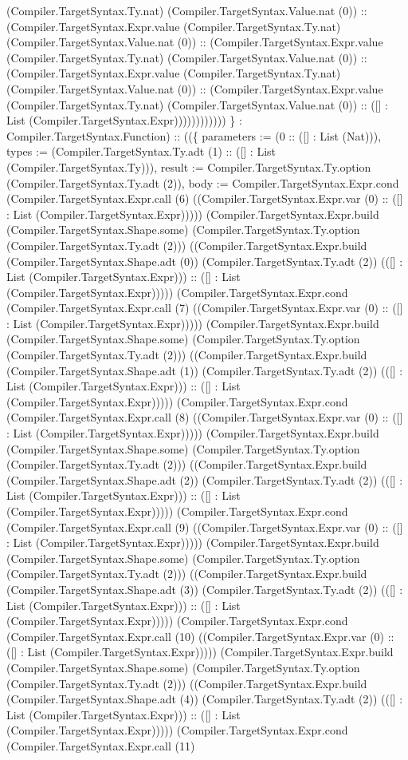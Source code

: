 \documentclass[11pt]{article}
\begin{document}
(Compiler.TargetSyntax.Ty.nat) (Compiler.TargetSyntax.Value.nat (0)) :: (Compiler.TargetSyntax.Expr.value (Compiler.TargetSyntax.Ty.nat) (Compiler.TargetSyntax.Value.nat (0)) :: (Compiler.TargetSyntax.Expr.value (Compiler.TargetSyntax.Ty.nat) (Compiler.TargetSyntax.Value.nat (0)) :: (Compiler.TargetSyntax.Expr.value (Compiler.TargetSyntax.Ty.nat) (Compiler.TargetSyntax.Value.nat (0)) :: (Compiler.TargetSyntax.Expr.value (Compiler.TargetSyntax.Ty.nat) (Compiler.TargetSyntax.Value.nat (0)) :: ([] : List (Compiler.TargetSyntax.Expr)))))))))))) \} : Compiler.TargetSyntax.Function) :: ((\{ parameters := (0 :: ([] : List (Nat))), types := (Compiler.TargetSyntax.Ty.adt (1) :: ([] : List (Compiler.TargetSyntax.Ty))), result := Compiler.TargetSyntax.Ty.option (Compiler.TargetSyntax.Ty.adt (2)), body := Compiler.TargetSyntax.Expr.cond (Compiler.TargetSyntax.Expr.call (6) ((Compiler.TargetSyntax.Expr.var (0) :: ([] : List (Compiler.TargetSyntax.Expr))))) (Compiler.TargetSyntax.Expr.build (Compiler.TargetSyntax.Shape.some) (Compiler.TargetSyntax.Ty.option (Compiler.TargetSyntax.Ty.adt (2))) ((Compiler.TargetSyntax.Expr.build (Compiler.TargetSyntax.Shape.adt (0)) (Compiler.TargetSyntax.Ty.adt (2)) (([] : List (Compiler.TargetSyntax.Expr))) :: ([] : List (Compiler.TargetSyntax.Expr))))) (Compiler.TargetSyntax.Expr.cond (Compiler.TargetSyntax.Expr.call (7) ((Compiler.TargetSyntax.Expr.var (0) :: ([] : List (Compiler.TargetSyntax.Expr))))) (Compiler.TargetSyntax.Expr.build (Compiler.TargetSyntax.Shape.some) (Compiler.TargetSyntax.Ty.option (Compiler.TargetSyntax.Ty.adt (2))) ((Compiler.TargetSyntax.Expr.build (Compiler.TargetSyntax.Shape.adt (1)) (Compiler.TargetSyntax.Ty.adt (2)) (([] : List (Compiler.TargetSyntax.Expr))) :: ([] : List (Compiler.TargetSyntax.Expr))))) (Compiler.TargetSyntax.Expr.cond (Compiler.TargetSyntax.Expr.call (8) ((Compiler.TargetSyntax.Expr.var (0) :: ([] : List (Compiler.TargetSyntax.Expr))))) (Compiler.TargetSyntax.Expr.build (Compiler.TargetSyntax.Shape.some) (Compiler.TargetSyntax.Ty.option (Compiler.TargetSyntax.Ty.adt (2))) ((Compiler.TargetSyntax.Expr.build (Compiler.TargetSyntax.Shape.adt (2)) (Compiler.TargetSyntax.Ty.adt (2)) (([] : List (Compiler.TargetSyntax.Expr))) :: ([] : List (Compiler.TargetSyntax.Expr))))) (Compiler.TargetSyntax.Expr.cond (Compiler.TargetSyntax.Expr.call (9) ((Compiler.TargetSyntax.Expr.var (0) :: ([] : List (Compiler.TargetSyntax.Expr))))) (Compiler.TargetSyntax.Expr.build (Compiler.TargetSyntax.Shape.some) (Compiler.TargetSyntax.Ty.option (Compiler.TargetSyntax.Ty.adt (2))) ((Compiler.TargetSyntax.Expr.build (Compiler.TargetSyntax.Shape.adt (3)) (Compiler.TargetSyntax.Ty.adt (2)) (([] : List (Compiler.TargetSyntax.Expr))) :: ([] : List (Compiler.TargetSyntax.Expr))))) (Compiler.TargetSyntax.Expr.cond (Compiler.TargetSyntax.Expr.call (10) ((Compiler.TargetSyntax.Expr.var (0) :: ([] : List (Compiler.TargetSyntax.Expr))))) (Compiler.TargetSyntax.Expr.build (Compiler.TargetSyntax.Shape.some) (Compiler.TargetSyntax.Ty.option (Compiler.TargetSyntax.Ty.adt (2))) ((Compiler.TargetSyntax.Expr.build (Compiler.TargetSyntax.Shape.adt (4)) (Compiler.TargetSyntax.Ty.adt (2)) (([] : List (Compiler.TargetSyntax.Expr))) :: ([] : List (Compiler.TargetSyntax.Expr))))) (Compiler.TargetSyntax.Expr.cond (Compiler.TargetSyntax.Expr.call (11) 
\end{document}
